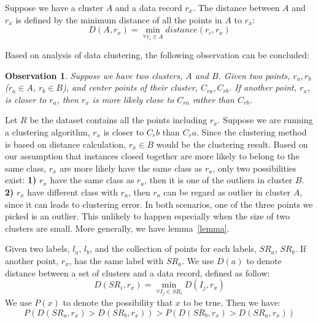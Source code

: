 \documentclass[runningheads]{llncs}
\newtheorem{observation}{Observation}
\begin{document}
	\begin{definition}
		
		Suppose we have a cluster $A$ and a data record $r_x$. The distance between $A$ and $r_x$ is defined by the minimum distance of all the points in $A$ to $r_x$:
		\begin{displaymath}
		D(A, r_x) = \min_{\forall r_i \in A} distance(r_i, r_x) 
		\end{displaymath}
	\end{definition}
	
	Based on analysis of data clustering, the following observation can be concluded:
	
	\begin{observation} \label{observation}
		Suppose we have two clusters, $A$ and $B$. Given two points, $r_a, r_b$ ($r_a \in A$, $r_b \in B$), and center points of their cluster, $C_{ra}, C_{rb}$. If another point, $r_x$, is closer to $r_a$, then $r_x$ is more likely close to $C_{ra}$ rather than $C_{rb}$.
	\end{observation}
	
	Let $R$ be the dataset contains all the points including $r_x$. Suppose we are running a clustering algorithm, $r_x$ is closer to $C_rb$ than $C_ra$. Since the clustering method is based on distance calculation, $r_x \in B$ would be the clustering result. Based on our assumption that instances closed together are more likely to belong to the same class, $r_x$ are more likely have the same class as $r_a$, only two possibilities exist: \textbf{1)} $r_x$ have the same class as $r_a$, then it is one of the outliers in cluster $B$. \textbf{2)} $r_x$ have different class with $r_a$, then $r_a$ can be regard as outlier in cluster $A$, since it can leads to clustering error. In both scenarios, one of the three points we picked is an outlier. This unlikely to happen especially when the size of two clusters are small. More generally, we have lemma~\ref{lemma}.
	
	\begin{lemma} \label{lemma}
		Given two labels, $l_a$, $l_b$, and the collection of points for each labels, $SR_a$, $SR_b$. If another point, $r_x$, has the same label with $SR_a$. We use $D(a)$ to denote distance between a set of clusters and a data record, defined as follow:
		\begin{displaymath}
		D(SR_i, r_x) = \min_{\forall I_j \in SR_i} D(I_j, r_x) 
		\end{displaymath}
		We use $P(x)$ to denote the possibility that $x$ to be true. Then we have:
		\begin{displaymath}
		P(D(SR_a, r_x) > D(SR_b, r_x)) > P(D(SR_b, r_x) > D(SR_a, r_x))
		\end{displaymath}
	\end{lemma}
	
\end{document}

